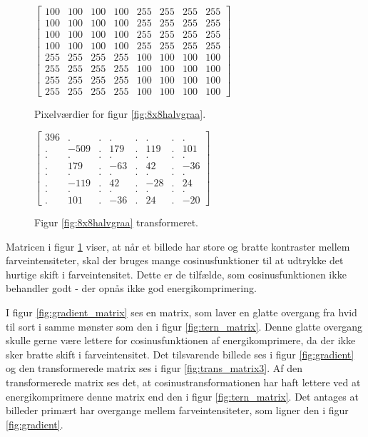 \begin{figure}[htbp]
\begin{minipage}[b]{0.5\linewidth}
\centering
$\begin{bmatrix}
100	&	100	&	100	&	100	&	255	&	255	&	255	&	255\\
100	&	100	&	100	&	100	&	255	&	255	&	255	&	255\\
100	&	100	&	100	&	100	&	255	&	255	&	255	&	255\\
100	&	100	&	100	&	100	&	255	&	255	&	255	&	255\\
255	&	255	&	255	&	255	&	100	&	100	&	100	&	100\\
255	&	255 &	255	&	255	&	100	&	100	&	100	&	100\\
255	&	255	&	255	&	255	&	100	&	100	&	100	&	100\\
255	&	255	&	255	&	255	&	100	&	100	&	100	&	100
\end{bmatrix}$
\caption{Pixelværdier for figur \ref{fig:8x8halvgraa}.\label{fig:tern_matrix}}
\end{minipage}
\hspace{0.5cm}
\begin{minipage}[b]{0.5\linewidth}
\centering
$\begin{bmatrix}
396	&	.		&	.	&	.	&	.	&	.	&	.	&	.	\\
.	&	-509		&	.	&	179	&	.	&	119	&	.	&	101	\\
.	&	.		&	.	&	.	&	.	&	.	&	.	&	.	\\
.	&	179		&	.	&	-63	&	.	&	42	&	.	&	-36	\\
.	&	.		&	.	&	.	&	.	&	.	&	.	&	.	\\
.	&	-119		&	.	&	42	&	.	&	-28	&	.	&	24	\\
.	&	.		&	.	&	.	&	.	&	.	&	.	&	.	\\
.	&	101		&	.	&	-36	&	.	&	24	&	.	&	-20
\end{bmatrix}
$
\caption{Figur \ref{fig:8x8halvgraa} transformeret.\label{fig:trans_matrix2}}
\end{minipage}
\end{figure}
Matricen i figur \ref{fig:trans_matrix2} viser, at når et billede har store og bratte kontraster mellem farveintensiteter, skal der bruges mange cosinusfunktioner til at udtrykke det hurtige skift i farveintensitet. Dette er de tilfælde, som cosinusfunktionen ikke behandler godt - der opnås ikke god energikomprimering.

I figur \ref{fig:gradient_matrix} ses en matrix, som laver en glatte overgang fra hvid til sort i samme mønster som den i figur \ref{fig:tern_matrix}. Denne glatte overgang skulle gerne være lettere for cosinusfunktionen af energikomprimere, da der ikke sker bratte skift i farveintensitet. Det tilsvarende billede ses i figur \ref{fig:gradient} og den transformerede matrix ses i figur \ref{fig:trans_matrix3}. Af den transformerede matrix ses det, at cosinustransformationen har haft lettere ved at energikomprimere denne matrix end den i figur \ref{fig:tern_matrix}. Det antages at billeder primært har overgange mellem farveintensiteter, som ligner den i figur \ref{fig:gradient}.

